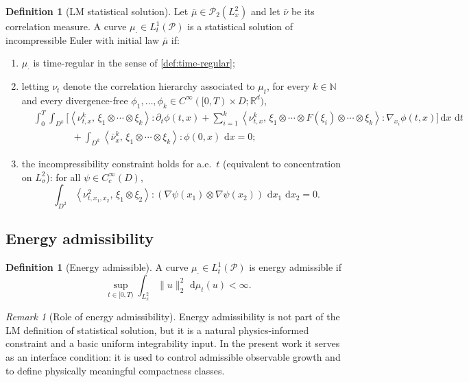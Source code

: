 \documentclass{article}
\numberwithin{equation}{section}
\theoremstyle{plain}
\theoremstyle{definition}
\newtheorem{definition}[theorem]{Definition}
\theoremstyle{remark}
\newtheorem{remark}[theorem]{Remark}
\newcommand{\N}{\mathbb{N}}
\newcommand{\R}{\mathbb{R}}
\newcommand{\Pcal}{\mathcal{P}}
\newcommand{\dd}{\,\mathrm{d}}
\newcommand{\ip}[2]{\left\langle #1,\,#2 \right\rangle}
\begin{document}
\begin{definition}[LM statistical solution]\label{def:LM-SS}
Let $\bar\mu\in\Pcal_2(L^2_x)$ and let $\bar\nu$ be its correlation measure.
A curve $\mu_\cdot\in L^1_t(\Pcal)$ is a statistical solution of incompressible Euler with initial law $\bar\mu$ if:
\begin{enumerate}[label=(\roman*),leftmargin=2.2em]
\item $\mu_\cdot$ is time-regular in the sense of \cref{def:time-regular};
\item letting $\nu_t$ denote the correlation hierarchy associated to $\mu_t$, for every $k\in\N$ and every divergence-free
$\phi_1,\dots,\phi_k\in C^\infty([0,T)\times D;\R^d)$,
\begin{align}
&\int_0^T\int_{D^k}\Big[
\ip{\nu^k_{t,x}}{\xi_1\otimes\cdots\otimes\xi_k}:\partial_t\phi(t,x)
+\sum_{i=1}^k \ip{\nu^k_{t,x}}{\xi_1\otimes\cdots\otimes F(\xi_i)\otimes\cdots\otimes\xi_k}:\nabla_{x_i}\phi(t,x)
\Big]\dd x\,\dd t \nonumber\\
&\qquad\qquad +\int_{D^k}\ip{\bar\nu^k_x}{\xi_1\otimes\cdots\otimes\xi_k}:\phi(0,x)\,\dd x =0;
\label{eq:LM-hierarchy}
\end{align}
\item the incompressibility constraint holds for a.e.\ $t$ (equivalent to concentration on $L^2_\sigma$):
for all $\psi\in C_c^\infty(D)$,
\begin{equation}\label{eq:LM-divfree}
\int_{D^2}\ip{\nu^2_{t,x_1,x_2}}{\xi_1\otimes\xi_2}:(\nabla\psi(x_1)\otimes\nabla\psi(x_2))\,\dd x_1\,\dd x_2 =0.
\end{equation}
\end{enumerate}
\end{definition}

\subsection{Energy admissibility}

\begin{definition}[Energy admissible]\label{def:energy-adm}
A curve $\mu_\cdot\in L^1_t(\Pcal)$ is energy admissible if
\[
\sup_{t\in[0,T)}\int_{L^2_x}\|u\|_2^2\,\dd\mu_t(u)<\infty.
\]
\end{definition}

\begin{remark}[Role of energy admissibility]
Energy admissibility is not part of the LM definition of statistical solution, but it is a natural physics-informed
constraint and a basic uniform integrability input. In the present work it serves as an interface condition: it is used
to control admissible observable growth and to define physically meaningful compactness classes.
\end{remark}
\end{document}
